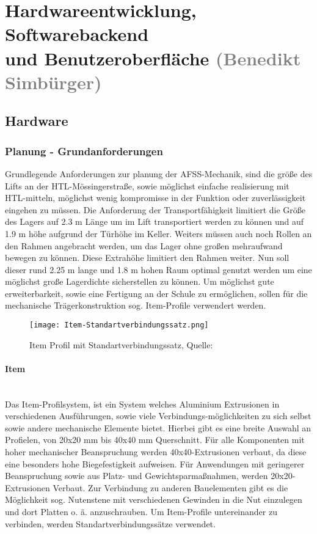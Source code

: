 \section{Hardwareentwicklung, Softwarebackend \\ und Benutzeroberfläche \textcolor{gray}{(Benedikt Simbürger)}}

\subsection{Hardware}

\subsubsection{Planung - Grundanforderungen}
Grundlegende Anforderungen zur planung der AFSS-Mechanik, sind die größe des Lifts an der HTL-Mössingerstraße, sowie möglichst einfache realisierung mit HTL-mitteln, möglichst wenig kompromisse in der Funktion oder zuverlässigkeit eingehen zu müssen.
Die Anforderung der Transportfähigkeit limitiert die Größe des Lagers auf 2.3 m Länge um im Lift transportiert werden zu können und auf 1.9 m höhe aufgrund der Türhöhe im Keller. Weiters müssen auch noch Rollen an den Rahmen angebracht werden, um das Lager  ohne großen mehraufwand bewegen zu können. Diese Extrahöhe limitiert den Rahmen weiter.
Nun soll dieser rund 2.25 m lange und 1.8 m hohen Raum optimal genutzt werden um eine möglichst große Lagerdichte sicherstellen zu können.
Um möglichst gute erweiterbarkeit, sowie eine Fertigung an der Schule zu ermöglichen, sollen für die mechanische Trägerkonstruktion sog. Item-Profile verwendert werden. 

\begin{wrapfigure}{r}{0.3\textwidth}
    \vspace{0mm}
    \texttt{[image: Item-Standartverbindungssatz.png]}
    \centering
    \caption{Item Profil mit Standartverbindungssatz, Quelle: \cite{Item_svs}}
\end{wrapfigure}
\paragraph{Item}\mbox{}\\
Das Item-Profilsystem, ist ein System welches Aluminium Extrusionen in verschiedenen Ausführungen, sowie viele Verbindungs-möglichkeiten zu sich selbst sowie andere mechanische Elemente bietet. Hierbei gibt es eine breite Auswahl an Profielen, von 20x20 mm bis 40x40 mm Querschnitt. Für alle Komponenten mit hoher mechanischer Beanspruchung werden 40x40-Extrusionen verbaut, da diese eine besonders hohe Biegefestigkeit aufweisen. Für Anwendungen mit geringerer Beanspruchung sowie aus Platz- und Gewichtsparmaßnahmen, werden 20x20-Extrusionen Verbaut. 
Zur Verbindung zu anderen Bauelementen gibt es die Möglichkeit sog. Nutenstene mit verschiedenen Gewinden in die Nut einzulegen und dort Platten o. ä. anzuschrauben. Um Item-Profile untereinander zu verbinden, werden Standartverbindungssätze verwendet. \\

